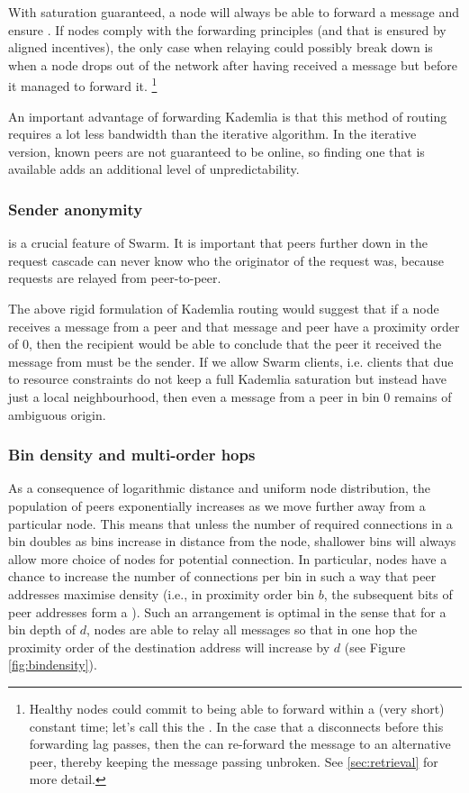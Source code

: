 With  saturation guaranteed, a node will always be able to forward a message and ensure . If nodes comply with the forwarding principles (and that is ensured by aligned incentives), the only case when relaying could possibly break down is when a node drops out of the network after having received a message but before it managed to forward it.%
%
\footnote{Healthy nodes could commit to being able to forward within a (very short) constant time; let's call this the . In the case that a  disconnects before this forwarding lag passes, then the  can re-forward the message to an alternative peer, thereby keeping the message passing unbroken. See \ref{sec:retrieval} for more detail.
} 

An important advantage of forwarding Kademlia is that this method of routing requires a lot less bandwidth than the iterative algorithm. In the iterative version, known peers are not guaranteed to be online, so finding one that is available adds an additional level of unpredictability.

\subsubsection{Sender anonymity}
 is a crucial feature of Swarm. It is important that peers further down in the request cascade can never know who the originator of the request was, because requests are relayed from peer-to-peer. 

The above rigid formulation of Kademlia routing would suggest that if a node receives a message from a peer and that message and peer have a proximity order of $0$, then the recipient would be able to conclude that the peer it received the message from must be the sender. If we allow  Swarm clients, i.e. clients that due to resource constraints do not keep a full Kademlia saturation but instead have just a local neighbourhood, then even a message from a peer in bin $0$ remains of ambiguous origin. 

\subsubsection{Bin density and multi-order hops} \label{sec:bindensity}

As a consequence of logarithmic distance and uniform node distribution, the population of peers exponentially increases as we move further away from a particular node.
This means that unless the number of required connections in a bin doubles as bins increase in distance from the node, shallower bins will always allow more choice of nodes for potential connection. In particular, nodes have a chance to increase the number of connections per bin in such a way that peer addresses maximise density (i.e., in proximity order bin $b$, the subsequent bits of peer addresses form a ). Such an arrangement is optimal in the sense that for a bin depth of $d$, nodes are able to relay all messages so that in one hop the proximity order of the destination address will increase by $d$ (see Figure \ref{fig:bindensity}). 


